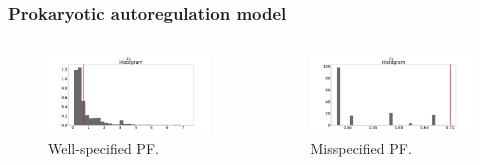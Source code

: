\documentclass{beamer}
\begin{document}
    \begin{frame}
    \frametitle{Prokaryotic autoregulation model}
    \begin{columns}
        \begin{column}{0.45\textwidth}
            \begin{figure}
                \centering
                \includegraphics[width=\columnwidth]{images/ar_pf_g2}
                \caption{Well-specified PF.}
            \end{figure}
        \end{column}
        \begin{column}{0.45\textwidth}
            \begin{figure}
                \centering
                \includegraphics[width=\columnwidth]{images/ar_pf_c2}
                \caption{Misspecified PF.}
            \end{figure}
        \end{column}
    \end{columns}
    

\end{frame}
\end{document}
